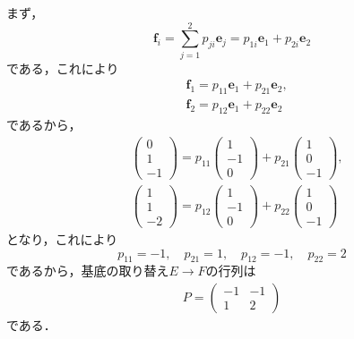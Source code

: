 \begin{tanswer}
  まず，
  \begin{equation*}
    \bm{f}_i=\sum^{2}_{j=1}p_{ji}\bm{e}_{j}=p_{1i}\bm{e}_1+p_{2i}\bm{e}_2
  \end{equation*}
  である，これにより
  \begin{align*}
     & \bm{f}_1=p_{11}\bm{e}_1+p_{21}\bm{e}_2, \\
     & \bm{f}_2=p_{12}\bm{e}_1+p_{22}\bm{e}_2
  \end{align*}
  であるから，
  \begin{align*}
     &
    \begin{pmatrix}
      0 \\
      1 \\
      -1
    \end{pmatrix}
    =
    p_{11}
    \begin{pmatrix}
      1  \\
      -1 \\
      0
    \end{pmatrix}
    +p_{21}
    \begin{pmatrix}
      1 \\
      0 \\
      -1
    \end{pmatrix}
    ,  \\
     &
    \begin{pmatrix}
      1 \\
      1 \\
      -2
    \end{pmatrix}
    =
    p_{12}
    \begin{pmatrix}
      1  \\
      -1 \\
      0
    \end{pmatrix}
    +p_{22}
    \begin{pmatrix}
      1 \\
      0 \\
      -1
    \end{pmatrix}
  \end{align*}
  となり，これにより
  \[
    p_{11}=-1,\quad p_{21}=1,\quad p_{12}=-1,\quad p_{22}=2
  \]
  であるから，基底の取り替え$E \to F$の行列は
  \begin{align*}
    P=
    \begin{pmatrix}
      -1 & -1 \\
      1  & 2
    \end{pmatrix}
  \end{align*}
  である．
\end{tanswer}


